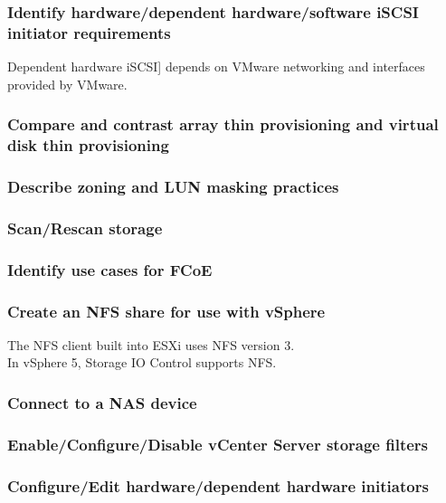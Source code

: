 \subsubsection{Identify hardware/dependent hardware/software iSCSI initiator requirements}

Dependent hardware iSCSI] depends on VMware networking and interfaces provided
by VMware.

\subsubsection{Compare and contrast array thin provisioning and virtual disk thin provisioning}

\subsubsection{Describe zoning and LUN masking practices}

\subsubsection{Scan/Rescan storage}

\subsubsection{Identify use cases for FCoE}

\subsubsection{Create an NFS share for use with vSphere}

The NFS client built into ESXi uses NFS version 3.\\

In vSphere 5, Storage IO Control supports NFS.

\subsubsection{Connect to a NAS device}

\subsubsection{Enable/Configure/Disable vCenter Server storage filters}

\subsubsection{Configure/Edit hardware/dependent hardware initiators}

